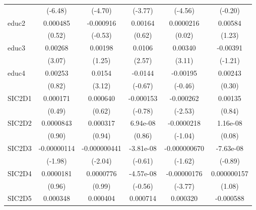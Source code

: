 \begin{table}[htbp]
\begin{tabular}{l*{5}{c}}
            &     (-6.48)         &     (-4.70)         &     (-3.77)         &     (-4.56)         &     (-0.20)         \\
educ2       &    0.000485         &   -0.000916         &     0.00164         &   0.0000216         &     0.00584         \\
            &      (0.52)         &     (-0.53)         &      (0.62)         &      (0.02)         &      (1.23)         \\
educ3       &     0.00268\sym{**} &     0.00198         &      0.0106\sym{*}  &     0.00340\sym{**} &    -0.00391         \\
            &      (3.07)         &      (1.25)         &      (2.57)         &      (3.11)         &     (-1.21)         \\
educ4       &     0.00253         &      0.0154\sym{**} &     -0.0144         &    -0.00195         &     0.00243         \\
            &      (0.82)         &      (3.12)         &     (-0.67)         &     (-0.46)         &      (0.30)         \\
SIC2D1      &    0.000171         &    0.000640         &   -0.000153         &   -0.000262\sym{*}  &     0.00135         \\
            &      (0.49)         &      (0.62)         &     (-0.78)         &     (-2.53)         &      (0.84)         \\
SIC2D2      &   0.0000843         &    0.000317         &    6.94e-08         &  -0.0000218         &    1.16e-08         \\
            &      (0.90)         &      (0.94)         &      (0.86)         &     (-1.04)         &      (0.08)         \\
SIC2D3      & -0.00000114\sym{*}  &-0.000000441\sym{*}  &   -3.81e-08         &-0.000000670         &   -7.63e-08         \\
            &     (-1.98)         &     (-2.04)         &     (-0.61)         &     (-1.62)         &     (-0.89)         \\
SIC2D4      &   0.0000181         &   0.0000776         &   -4.57e-08         & -0.00000176\sym{***}& 0.000000157         \\
            &      (0.96)         &      (0.99)         &     (-0.56)         &     (-3.77)         &      (1.08)         \\
SIC2D5      &    0.000348         &    0.000404         &    0.000714         &    0.000320         &   -0.000588         \\

\end{tabular}
\end{table}
